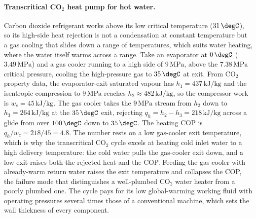 \paragraph{Transcritical \texorpdfstring{CO$_2$}{CO2} heat pump for hot water.}
Carbon dioxide refrigerant works above its low critical temperature
($31\,\degC$), so its high-side heat rejection is not a condensation at constant
temperature but a gas cooling that slides down a range of temperatures, which
suits water heating, where the water itself warms across a range. Take an
evaporator at $0\,\degC$ ($3.49\,\text{MPa}$) and a gas cooler running to a high
side of $9\,\text{MPa}$, above the $7.38\,\text{MPa}$ critical pressure, cooling
the high-pressure gas to $35\,\degC$ at exit. From CO$_2$ property data, the
evaporator-exit saturated vapour has $h_1 = 437\,\text{kJ}/\text{kg}$ and the
isentropic compression to $9\,\text{MPa}$ reaches $h_2 \approx 482\,\text{kJ}/
\text{kg}$, so the compressor work is $w_c = 45\,\text{kJ}/\text{kg}$. The gas
cooler takes the $9\,\text{MPa}$ stream from $h_2$ down to $h_3 = 264\,\text{kJ}/
\text{kg}$ at the $35\,\degC$ exit, rejecting $q_h = h_2 - h_3 = 218\,\text{kJ}/
\text{kg}$ across a glide from over $100\,\degC$ down to $35\,\degC$. The heating
COP is $q_h/w_c = 218/45 = 4.8$. The number rests on a low gas-cooler exit
temperature, which is why the transcritical CO$_2$ cycle excels at heating cold
inlet water to a high delivery temperature: the cold water pulls the gas-cooler
exit down, and a low exit raises both the rejected heat and the COP. Feeding the
gas cooler with already-warm return water raises the exit temperature and
collapses the COP, the failure mode that distinguishes a well-plumbed CO$_2$
water heater from a poorly plumbed one. The cycle pays for its low global-warming
working fluid with operating pressures several times those of a conventional
machine, which sets the wall thickness of every component.

